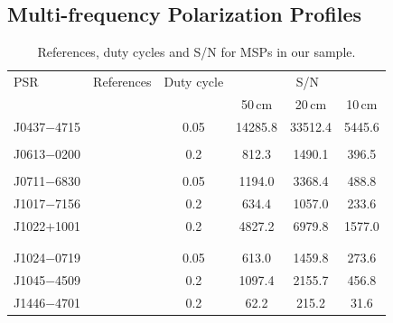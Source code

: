 \documentclass[useAMS,usenatbib]{mn2e}
\begin{document}
\begin{appendix}

\section{Multi-frequency Polarization Profiles}

\begin{table}
\centering
\caption{References, duty cycles and S/N for MSPs in our sample.}
\label{ref}
\begin{tabular}{lccccc}
\hline
PSR          &    References                       &  Duty cycle           &    \multicolumn{3}{c}{S/N}                   \\  
             &                                     &                       &    50\,cm    &  20\,cm      &  10\,cm        \\   
\hline
J0437$-$4715 & \citet{Johnston93,Manchester95_1}   & 0.05  &    14285.8 	 &   33512.4  	&     5445.6    \\  
             & \citet{Navarro97,Yan11}             &       &               &              &               \\  
J0613$-$0200 & \citet{Xilouris98,Stairs99}         & 0.2   &      812.3 	 &    1490.1  	&      396.5    \\  
             & \citet{Ord04,Yan11}                 &       &               &              &               \\  
J0711$-$6830 & \citet{Manchester04,Ord04,Yan11}    & 0.05  &     1194.0 	 &    3368.4  	&      488.8    \\  
J1017$-$7156 & \citet{Keith12}                     & 0.2   &      634.4 	 &    1057.0  	&      233.6    \\
J1022$+$1001 & \citet{Xilouris98,1022Kramer99}     & 0.2   &     4827.2 	 &    6979.8  	&     1577.0    \\  
             & \citet{Stairs99,Ord04,Yan11}        &       &               &              &               \\
             &                                     &       &               &              &               \\
J1024$-$0719 & \citet{Xilouris98,Ord04,Yan11}      & 0.05  &      613.0 	 &    1459.8  	&      273.6    \\  
J1045$-$4509 & \citet{Manchester04,Ord04,Yan11}    & 0.2   &     1097.4 	 &    2155.7  	&      456.8    \\  
J1446$-$4701 & \citet{Keith12}                     & 0.2   &       62.2 	 &     215.2  	&       31.6    \\

\end{tabular}
\end{table}
\end{appendix}
\end{document}
